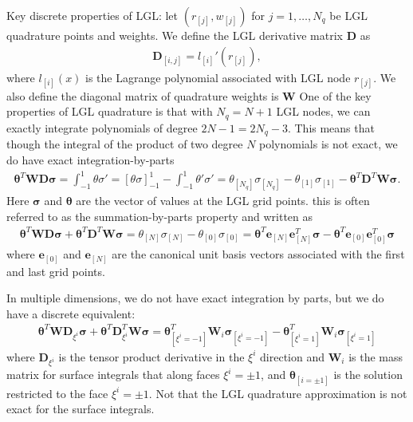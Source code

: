 \documentclass{report}
\newcommand{\mat}[1]{\boldsymbol #1}
\newcommand{\dvec}[1]{\boldsymbol #1}
\begin{document}
Key discrete properties of LGL: let $(r_{[j]}, w_{[j]})$ for $j = 1, \dots, N_q$ be LGL quadrature points and weights.
We define the LGL derivative matrix $\mat{D}$ as
\begin{align}
    \mat{D}_{[i,j]} = l_{[i]}'(r_{[j]}),
\end{align}
where $l_{[i]}(x)$ is the Lagrange polynomial associated with LGL node $r_{[j]}$.
We also define the diagonal matrix of quadrature weights is $\mat{W}$
One of the key properties of LGL quadrature is that with $N_q = N + 1$ LGL nodes, we can exactly integrate polynomials of degree $2N - 1 = 2N_q -3$.
This means that though the integral of the product of two degree $N$ polynomials is not exact, we do have exact integration-by-parts
\begin{align}
    \dvec{\theta}^{T} \mat{W} \mat{D} \dvec{\sigma} =
    \int_{-1}^{1} \theta \sigma' =  
    {\left[\theta \sigma\right]}_{-1}^{1} - \int_{-1}^{1} \theta' \sigma' =
    \theta_{[N_q]} \sigma_{[N_q]} - \theta_{[1]} \sigma_{[1]} -  \dvec{\theta}^{T} \mat{D}^{T} \mat{W} \dvec{\sigma}.
\end{align}
Here $\dvec{\sigma}$ and $\dvec{\theta}$ are the vector of values at the LGL grid points.
this is often referred to as the summation-by-parts property and written as
\begin{align}
    \dvec{\theta}^{T} \mat{W} \mat{D} \dvec{\sigma} + \dvec{\theta}^{T} \mat{D}^{T} \mat{W} \dvec{\sigma}
    =  \theta_{[N]} \sigma_{[N]} - \theta_{[0]} \sigma_{[0]}
    =
    \dvec{\theta}^{T} \dvec{e}_{[N]} \dvec{e}_{[N]}^{T} \dvec{\sigma}
    -
    \dvec{\theta}^{T} \dvec{e}_{[0]} \dvec{e}_{[0]}^{T} \dvec{\sigma}
\end{align}
where $\dvec{e}_{[0]}$ and $\dvec{e}_{[N]}$ are the canonical unit basis vectors associated with the first and last grid points.

In multiple dimensions, we do not have exact integration by parts, but we do have a discrete equivalent:
\begin{align}
   \dvec{\theta}^{T} \mat{W} \mat{D}_{\xi^i} \dvec{\sigma} + \dvec{\theta}^{T} \mat{D}_{\xi^i}^{T} \mat{W} \dvec{\sigma}
   =
   \dvec{\theta}_{[\xi^i=-1]}^{T} \mat{W}_{i} \dvec{\sigma}_{[\xi^i=-1]}
   -
   \dvec{\theta}_{[\xi^i=1]}^{T} \mat{W}_{i} \dvec{\sigma}_{[\xi^i=1]}
\end{align}
where $\mat{D}_{\xi^i}$ is the tensor product derivative in the $\xi^{i}$ direction
and $\mat{W}_{i}$ is the mass matrix for surface integrals that along faces $\xi^{i} = \pm 1$,
and
$\dvec{\theta}_{[i=\pm1]}$ is the solution restricted to the face $\xi^{i} = \pm 1$.
Not that the LGL quadrature approximation is not exact for the surface integrals.
\end{document}

